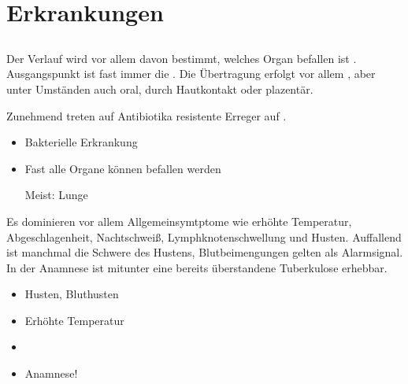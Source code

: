 \clearpage %
\section{ Erkrankungen}



\subsection{}
\label{topic:tuberkulose}


{%
Der Verlauf wird vor allem davon bestimmt, welches
Organ befallen ist . Ausgangspunkt ist fast immer die .
Die Übertragung erfolgt vor allem , aber unter
Umständen auch oral, durch Hautkontakt oder plazentär. 

Zunehmend treten auf Antibiotika resistente Erreger auf .


    
}{
\begin{itemize}
  \item Bakterielle Erkrankung
  \item Fast alle Organe können befallen werden
  
  Meist: Lunge
\end{itemize}
}


\TextSlide{\TxSymptome}
{%
Es dominieren vor allem Allgemeinsymtptome wie erhöhte
Temperatur, Abgeschlagenheit, Nachtschweiß,
Lymphknotenschwellung und Husten. Auffallend ist manchmal
die Schwere des Hustens, Blutbeimengungen gelten als
Alarmsignal.
In der Anamnese ist mitunter eine bereits überstandene
Tuberkulose erhebbar.
}{
\begin{itemize}
  \item Husten, Bluthusten
  \item Erhöhte Temperatur
  \item {}
  \item Anamnese!
\end{itemize}
}
{}
{}
{}

